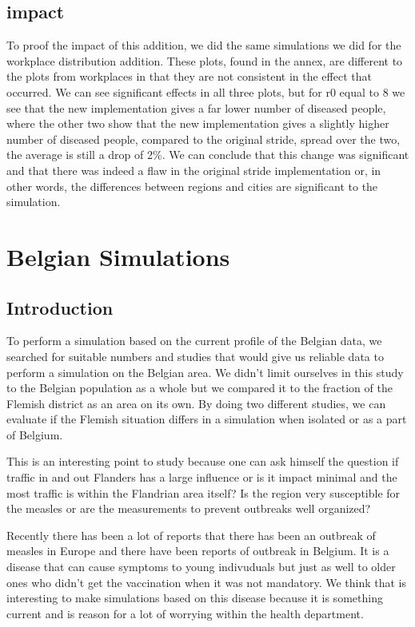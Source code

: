 \documentclass[runningheads]{llncs}
\begin{document}
	\subsection{impact}
	To proof the impact of this addition, we did the same simulations we did for the workplace distribution addition. These plots, found in the annex, are different to the plots from workplaces in that they are not consistent in the effect that occurred. We can see significant effects in all three plots, but for r0 equal to 8 we see that the new implementation gives a far lower number of diseased people, where the other two show that the new implementation gives a slightly higher number of diseased people, compared to the original stride, spread over the two, the average is still a drop of 2\%. We can conclude that this change was significant and that there was indeed a flaw in the original stride implementation or, in other words, the differences between regions and cities are significant to the simulation.

	\newpage
	
	\section{Belgian Simulations}
	\subsection{Introduction}
	To perform a simulation based on the current profile of the Belgian data, we searched for suitable numbers and studies that would give us reliable data to perform a simulation on the Belgian area.
	We didn't limit ourselves in this study to the Belgian population as a whole but we compared it to the fraction of the Flemish district as an area on its own.
	By doing two different studies, we can evaluate if the Flemish situation differs in a simulation when isolated or as a part of Belgium.
	
	This is an interesting point to study because one can ask himself the question if traffic in and out Flanders has a large influence or is it impact minimal and the most traffic is within the Flandrian area itself? Is the region very susceptible for the measles or are the measurements to prevent outbreaks well organized?
	
	Recently there has been a lot of reports that there has been an outbreak of measles in Europe and there have been reports of outbreak in Belgium. It is a disease that can cause symptoms to young indivuduals but just as well to older ones who didn't get the vaccination when it was not mandatory. We think that is interesting to make simulations based on this disease because it is something current and is reason for a lot of worrying within the health department.
	
\end{document}
